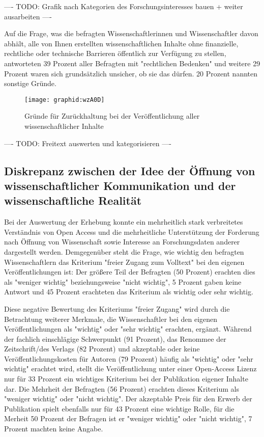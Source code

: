 ---- TODO: Grafik nach Kategorien des Forschungsinteresses bauen + weiter ausarbeiten ----

Auf die Frage, was die befragten Wissenschaftlerinnen und Wissenschaftler davon abhält, alle von Ihnen erstellten wissenschaftlichen Inhalte ohne finanzielle, rechtliche oder technische Barrieren öffentlich zur Verfügung zu stellen, antworteten 39 Prozent aller Befragten mit "rechtlichen Bedenken" und weitere 29 Prozent waren sich grundsätzlich unsicher, ob sie das dürfen. 20 Prozent nannten sonstige Gründe.

\begin{figure}[h!]
\texttt{[image: graphid:wzA0D]}
\caption{Gründe für Zurückhaltung bei der Veröffentlichung aller wissenschaftlicher Inhalte}
\end{figure}

---- TODO: Freitext auswerten und kategorisieren ----

\subsection{Diskrepanz zwischen der Idee der Öffnung von wissenschaftlicher Kommunikation und der wissenschaftliche Realität}

Bei der Auswertung der Erhebung konnte ein mehrheitlich stark verbreitetes Verständnis von Open Access und die mehrheitliche Unterstützung der Forderung nach Öffnung von Wissenschaft sowie Interesse an Forschungsdaten anderer dargestellt werden. Demgegenüber steht die Frage, wie wichtig den befragten Wissenschaftlern das Kriterium "freier Zugang zum Volltext" bei den eigenen Veröffentlichungen ist: Der größere Teil der Befragten (50 Prozent) erachten dies als "weniger wichtig" beziehungsweise "nicht wichtig", 5 Prozent gaben keine Antwort und 45 Prozent erachteten das Kriterium als wichtig oder sehr wichtig.

Diese negative Bewertung des Kriteriums "freier Zugang" wird durch die Betrachtung weiterer Merkmale, die Wissenschaftler bei den eigenen Veröffentlichungen als "wichtig" oder "sehr wichtig" erachten, ergänzt. Während der fachlich einschlägige Schwerpunkt (91 Prozent), das Renommee der Zeitschrift/des Verlags (82 Prozent) und akzeptable oder keine Veröffentlichungskosten für Autoren (79 Prozent) häufig als "wichtig" oder "sehr wichtig" erachtet wird, stellt die Veröffentlichung unter einer Open-Access Lizenz nur für 33 Prozent ein wichtiges Kriterium bei der Publikation eigener Inhalte dar. Die Mehrheit der Befragten (56 Prozent) erachten dieses Kriterium als "weniger wichtig" oder "nicht wichtig". Der akzeptable Preis für den Erwerb der Publikation spielt ebenfalls nur für 43 Prozent eine wichtige Rolle, für die Merheit 50 Prozent der Befragen ist er "weniger wichtig" oder "nicht wichtig", 7 Prozent machten keine Angabe.

